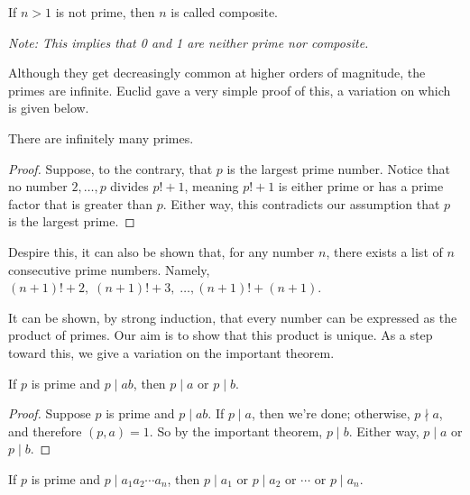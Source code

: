 \documentclass[../m55main.tex]{chapters}
\begin{document}
\begin{definition}
    If $n > 1$ is not prime, then $n$ is called composite.

    \medskip
    \textit{Note: This implies that 0 and 1 are neither prime nor composite.}
\end{definition}

Although they get decreasingly common at higher orders of magnitude, the primes are infinite.
Euclid gave a very simple proof of this, a variation on which is given below.

\begin{theorem}
    There are infinitely many primes.
\end{theorem}

\begin{proof}
    Suppose, to the contrary, that $p$ is the largest prime number.
    Notice that no number $2, \ldots, p$ divides $p! + 1$, meaning $p! + 1$ is either prime or has a prime factor that is greater than $p$.
    Either way, this contradicts our assumption that $p$ is the largest prime.
\end{proof}

Despire this, it can also be shown that, for any number $n$, there exists a list of $n$ consecutive prime numbers.
Namely, $(n+1)! + 2, \; (n+1)! + 3, \; \ldots, (n+1)! + (n+1)$.

It can be shown, by strong induction, that every number can be expressed as the product of primes.
Our aim is to show that this product is unique.
As a step toward this, we give a variation on the important theorem.

\begin{theorem}
    If $p$ is prime and $p \mid ab$, then $p \mid a$ or $p \mid b$.
\end{theorem}

\begin{proof}
    Suppose $p$ is prime and $p \mid ab$.
    If $p \mid a$, then we're done; otherwise, $p \nmid a$, and therefore $(p,a) = 1$.
    So by the important theorem, $p \mid b$.
    Either way, $p \mid a$ or $p \mid b$.
\end{proof}

\begin{corollary}
    If $p$ is prime and $p \mid a_1 a_2 \cdots a_n$, then $p \mid a_1$ or $p \mid a_2$ or $\cdots$ or $p \mid a_n$.
\end{corollary}

\end{document}
